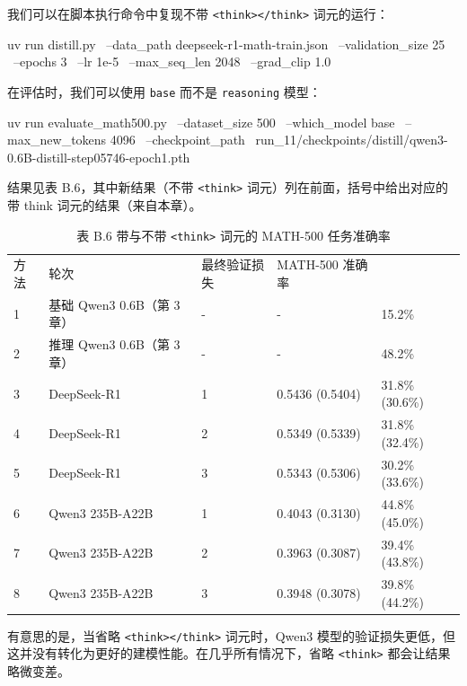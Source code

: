我们可以在脚本执行命令中复现不带 \texttt{\textless{}think\textgreater{}\textless{}/think\textgreater{}} 词元的运行：

\begin{codebox}
uv run distill.py \
--data_path deepseek-r1-math-train.json \
--validation_size 25 \
--epochs 3 \
--lr 1e-5 \
--max_seq_len 2048 \
--grad_clip 1.0
\end{codebox}

在评估时，我们可以使用 \texttt{base} 而不是 \texttt{reasoning} 模型：

\begin{codebox}
uv run evaluate_math500.py \
--dataset_size 500 \
--which_model base \
--max_new_tokens 4096 \
--checkpoint_path \
run_11/checkpoints/distill/qwen3-0.6B-distill-step05746-epoch1.pth
\end{codebox}

结果见表 B.6，其中新结果（不带 \texttt{\textless{}think\textgreater{}} 词元）列在前面，括号中给出对应的带 think 词元的结果（来自本章）。

\begin{table}[htbp]
\centering\small
\centering
\caption{表 B.6 带与不带 \texttt{\textless{}think\textgreater{}} 词元的 MATH-500 任务准确率}
\begin{tabularx}{\linewidth}{XXXXX}
\toprule
方法 & 轮次 & 最终验证损失 & MATH-500 准确率 &  \\
1 & 基础 Qwen3 0.6B（第 3 章） & - & - & 15.2\% \\
2 & 推理 Qwen3 0.6B（第 3 章） & - & - & 48.2\% \\
3 & DeepSeek-R1 & 1 & 0.5436 (0.5404) & 31.8\% (30.6\%) \\
4 & DeepSeek-R1 & 2 & 0.5349 (0.5339) & 31.8\% (32.4\%) \\
5 & DeepSeek-R1 & 3 & 0.5343 (0.5306) & 30.2\% (33.6\%) \\
6 & Qwen3 235B-A22B & 1 & 0.4043 (0.3130) & 44.8\% (45.0\%) \\
7 & Qwen3 235B-A22B & 2 & 0.3963 (0.3087) & 39.4\% (43.8\%) \\
8 & Qwen3 235B-A22B & 3 & 0.3948 (0.3078) & 39.8\% (44.2\%) \\ \bottomrule
\end{tabularx}
\end{table}

有意思的是，当省略 \texttt{\textless{}think\textgreater{}\textless{}/think\textgreater{}} 词元时，Qwen3 模型的验证损失更低，但这并没有转化为更好的建模性能。在几乎所有情况下，省略 \texttt{\textless{}think\textgreater{}} 都会让结果略微变差。
